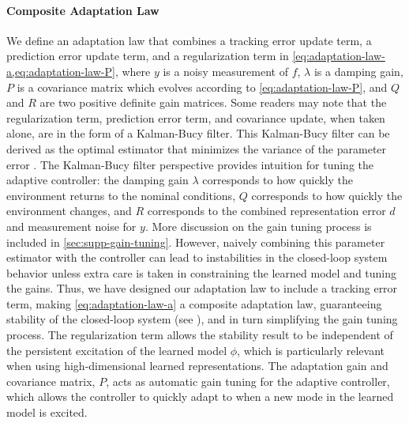 \paragraph{Composite Adaptation Law}

We define an adaptation law that combines a tracking error update term, a prediction error update term, and a regularization term in \cref{eq:adaptation-law-a,eq:adaptation-law-P},
where $y$ is a noisy measurement of $f$, $\lambda$ is a damping gain, $P$ is a covariance matrix which evolves according to \cref{eq:adaptation-law-P}, and $Q$ and $R$ are two positive definite gain matrices. Some readers may note that the regularization term, prediction error term, and covariance update, when taken alone, are in the form of a Kalman-Bucy filter. This Kalman-Bucy filter can be derived as the optimal estimator that minimizes the variance of the parameter error \cite{kalman_new_1961}.
The Kalman-Bucy filter perspective provides intuition for tuning the adaptive controller: the damping gain $\lambda$ corresponds to how quickly the environment returns to the nominal conditions, $Q$ corresponds to how quickly the environment changes, and $R$ corresponds to the combined representation error $d$ and measurement noise for $y$. More discussion on the gain tuning process is included in \ref{sec:supp-gain-tuning}. However, naively combining this parameter estimator with the controller can lead to instabilities in the closed-loop system behavior unless extra care is taken in constraining the learned model and tuning the gains. Thus, we have designed our adaptation law to include a tracking error term, making \cref{eq:adaptation-law-a} a composite adaptation law, guaranteeing stability of the closed-loop system (see ), and in turn simplifying the gain tuning process. The regularization term allows the stability result to be independent of the persistent excitation of the learned model $\phi$, which is particularly relevant when using high-dimensional learned representations. The adaptation gain and covariance matrix, $P$, acts as automatic gain tuning for the adaptive controller, which allows the controller to quickly adapt to when a new mode in the learned model is excited. 

